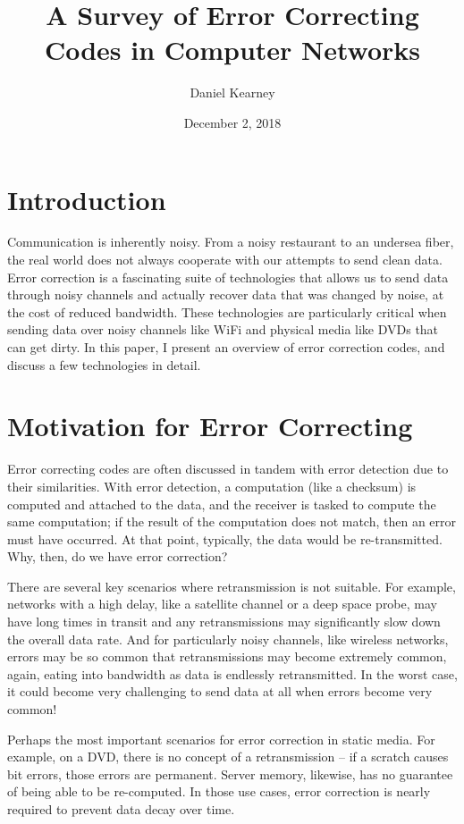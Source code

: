\documentclass[12pt]{article}
\title{A Survey of Error Correcting Codes in Computer Networks}
\author{Daniel Kearney}
\date{December 2, 2018}
\begin{document}
\maketitle

\section{Introduction}

Communication is inherently noisy. From a noisy restaurant to an undersea fiber, the real world does not always cooperate with our attempts to send clean data. Error correction is a fascinating suite of technologies that allows us to send data through noisy channels and actually recover data that was changed by noise, at the cost of reduced bandwidth. These technologies are particularly critical when sending data over noisy channels like WiFi and physical media like DVDs that can get dirty. In this paper, I present an overview of error correction codes, and discuss a few technologies in detail.

\section{Motivation for Error Correcting}

Error correcting codes are often discussed in tandem with error detection due to their similarities. With error detection, a computation (like a checksum) is computed and attached to the data, and the receiver is tasked to compute the same computation; if the result of the computation does not match, then an error must have occurred. At that point, typically, the data would be re-transmitted. Why, then, do we have error correction?

There are several key scenarios where retransmission is not suitable. For example, networks with a high delay, like a satellite channel or a deep space probe, may have long times in transit and any retransmissions may significantly slow down the overall data rate. \cite{pless} And for particularly noisy channels, like wireless networks, errors may be so common that retransmissions may become extremely common, again, eating into bandwidth as data is endlessly retransmitted. In the worst case, it could become very challenging to send data at all when errors become very common!

Perhaps the most important scenarios for error correction in static media. For example, on a DVD, there is no concept of a retransmission -- if a scratch causes bit errors, those errors are permanent. Server memory, likewise, has no guarantee of being able to be re-computed. In those use cases, error correction is nearly required to prevent data decay over time. \cite{pless}
\end{document}
